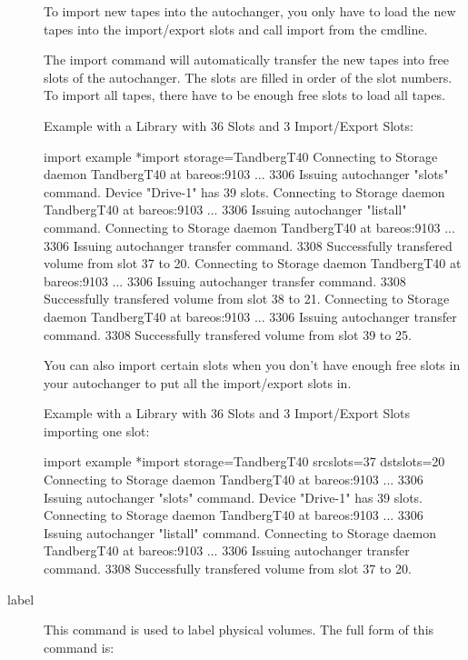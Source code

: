 \begin{description}
   To import new tapes into the autochanger, you only have to load the new
   tapes into the import/export slots and call import from the cmdline.

   The import command will automatically transfer the new tapes into free
   slots of the autochanger. The slots are filled in order of the slot numbers.
   To import all tapes, there have to be enough free slots to load all tapes.

   Example with a Library with 36 Slots and 3 Import/Export Slots:

\begin{bconsole}{import example}
*import storage=TandbergT40
Connecting to Storage daemon TandbergT40 at bareos:9103 ...
3306 Issuing autochanger "slots" command.
Device "Drive-1" has 39 slots.
Connecting to Storage daemon TandbergT40 at bareos:9103 ...
3306 Issuing autochanger "listall" command.
Connecting to Storage daemon TandbergT40 at bareos:9103 ...
3306 Issuing autochanger transfer command.
3308 Successfully transfered volume from slot 37 to 20.
Connecting to Storage daemon TandbergT40 at bareos:9103 ...
3306 Issuing autochanger transfer command.
3308 Successfully transfered volume from slot 38 to 21.
Connecting to Storage daemon TandbergT40 at bareos:9103 ...
3306 Issuing autochanger transfer command.
3308 Successfully transfered volume from slot 39 to 25.
\end{bconsole}

   You can also import certain slots when you don't have enough free slots
   in your autochanger to put all the import/export slots in.

   Example with a Library with 36 Slots and 3 Import/Export Slots importing one slot:

\begin{bconsole}{import example}
*import storage=TandbergT40 srcslots=37 dstslots=20
Connecting to Storage daemon TandbergT40 at bareos:9103 ...
3306 Issuing autochanger "slots" command.
Device "Drive-1" has 39 slots.
Connecting to Storage daemon TandbergT40 at bareos:9103 ...
3306 Issuing autochanger "listall" command.
Connecting to Storage daemon TandbergT40 at bareos:9103 ...
3306 Issuing autochanger transfer command.
3308 Successfully transfered volume from slot 37 to 20.
\end{bconsole}

\item [label]
   This command is used to label physical volumes.
   The full form of this command is:


\end{description}
